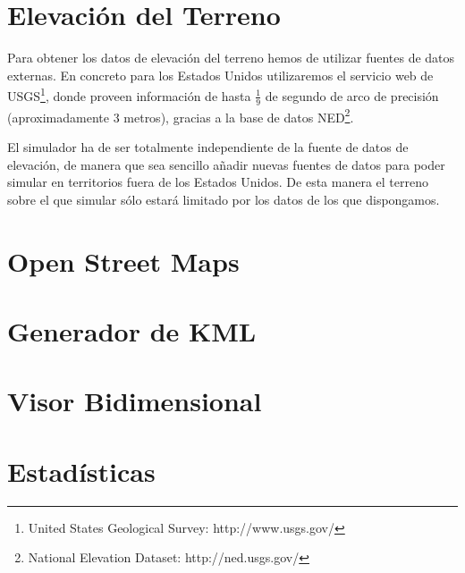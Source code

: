 \section*{Elevación del Terreno}

Para obtener los datos de elevación del terreno hemos de utilizar fuentes de
datos externas. En concreto para los Estados Unidos utilizaremos el servicio
web de USGS\footnote{United States Geological Survey: http://www.usgs.gov/},
donde proveen información de hasta $ \tfrac{1}{9} $ de segundo de arco de
precisión (aproximadamente 3 metros), gracias a la base de datos
NED\footnote{National Elevation Dataset: http://ned.usgs.gov/}.

El simulador ha de ser totalmente independiente de la fuente de datos de
elevación, de manera que sea sencillo añadir nuevas fuentes de datos para poder
simular en territorios fuera de los Estados Unidos. De esta manera el terreno
sobre el que simular sólo estará limitado por los datos de los que dispongamos.

\section*{Open Street Maps}

\section*{Generador de KML}

\section*{Visor Bidimensional}

\section*{Estadísticas}